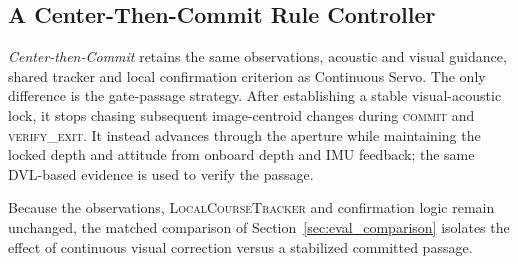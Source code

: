\subsection{A Center-Then-Commit Rule Controller}
\label{sec:center_commit_baseline}

\emph{Center-then-Commit} retains the same observations, acoustic and visual guidance, shared tracker and local confirmation criterion as Continuous Servo. The only difference is the gate-passage strategy. After establishing a stable visual-acoustic lock, it stops chasing subsequent image-centroid changes during \textsc{commit} and \textsc{verify\_exit}. It instead advances through the aperture while maintaining the locked depth and attitude from onboard depth and IMU feedback; the same DVL-based evidence is used to verify the passage.

Because the observations, \textsc{LocalCourseTracker} and confirmation logic remain unchanged, the matched comparison of Section~\ref{sec:eval_comparison} isolates the effect of continuous visual correction versus a stabilized committed passage.





